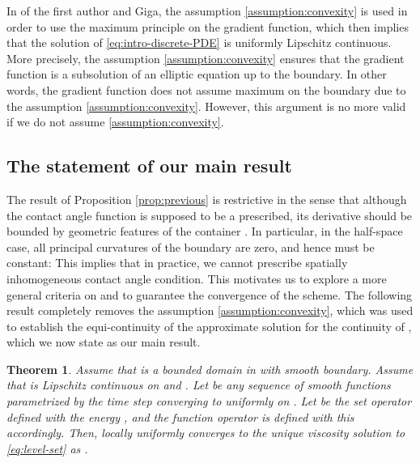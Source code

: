 \documentclass[11pt]{article}
\makeatletter
\numberwithin{equation}{section}
\newtheorem{theorem}{Theorem}[section]
\newcommand{\R}{\mathbb{R}}
\newcommand{\pOmega}[0]{\partial\Omega}
\newcounter{mathrecordid}
\newcommand{\mathboxbegin}[1]{%
  \stepcounter{mathrecordid}%
  \immediate\write\mathrecords{\themathrecordid,#1}%
  \special{pdf:bann << /Type /Annot /Subtype /Link /Border [0 0 0]
    /MathBoxID \themathrecordid /F 2
    /A << /S /URI /URI (urn:mathbox:\themathrecordid) >> >>}}
\newcommand{\mathboxinlineplain}[1]{$#1$}
\newcommand{\mathboxinline}[1]{%
  $\mathboxbegin{inline}%
  \special{pdf:literal direct /MathBoxBegin\themathrecordid\space MP}%
  #1\special{pdf:literal direct /MathBoxEnd\themathrecordid\space MP}%
  \special{pdf:eann}$}
\newcommand{\recordmath}{%
  \ifmeasuring@\expandafter\mathboxinlineplain
  \else\expandafter\mathboxinline\fi}
\makeatother
\begin{document}
In \cite{EG25} of the first author and Giga, the assumption \eqref{assumption:convexity} is used in order to use the maximum principle on the gradient function, which then implies that the solution \recordmath{w} of \eqref{eq:intro-discrete-PDE} is uniformly Lipschitz continuous. More precisely, the assumption \eqref{assumption:convexity} ensures that the gradient function is a subsolution of an elliptic equation up to the boundary. In other words,  the gradient function does not assume maximum on the boundary \recordmath{\partial\Omega} due to the assumption \eqref{assumption:convexity}. However, this argument is no more valid if we do not assume \eqref{assumption:convexity}.


\subsection{The statement of our main result} The result of Proposition \ref{prop:previous} is restrictive in the sense that although the contact angle function \recordmath{\beta} is supposed to be a prescribed, its derivative
should be bounded by geometric features of the container \recordmath{\Omega}.
In particular, in the half-space case, all principal curvatures of the boundary are zero, and hence \recordmath{\beta} must be constant: This implies that in practice, we cannot prescribe spatially inhomogeneous contact angle condition. This motivates us to explore a more general criteria on \recordmath{\Omega} and \recordmath{\beta} to guarantee the convergence of the scheme. The following result completely removes the assumption \eqref{assumption:convexity}, which was used to establish the equi-continuity of the approximate solution \recordmath{w} for the continuity of \recordmath{T_h}, which we now state as our main result.

\begin{theorem}\label{thm:main}
Assume that \recordmath{\Omega} is a bounded domain in \recordmath{\R^d} with smooth boundary.
Assume that \recordmath{\beta} is Lipschitz continuous on \recordmath{\pOmega} and \recordmath{\|\beta\|_{C^0(\partial\Omega)}<1}.
Let \recordmath{\{\beta^h\}_{h>0}} be any sequence of smooth functions parametrized by the time step \recordmath{h>0} converging to \recordmath{\beta} uniformly on \recordmath{\pOmega}. Let \recordmath{T_h} be the set operator defined with the energy \recordmath{J_{\beta^h}(u)}, and the function operator \recordmath{S_h} is defined with this \recordmath{T_h} accordingly.
Then, \recordmath{u^h} locally uniformly converges to the unique viscosity solution to \eqref{eq:level-set} as \recordmath{h\to 0}.
\end{theorem}
\end{document}
